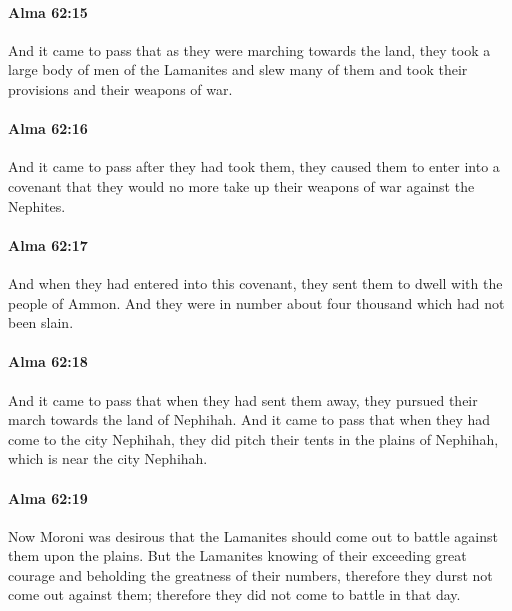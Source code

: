 		\paragraph{Alma 62:15} %
			\label{ALMA-62-15}

			And it came to pass that as they were marching towards the land,
			they took a large body of men of the Lamanites and slew many of them
			and took their provisions and their weapons of war.

		\paragraph{Alma 62:16} %
			\label{ALMA-62-16}

			And it came to pass after they had took them,
			they caused them to enter into a covenant
			that they would no more take up their weapons of war against the Nephites.

		\paragraph{Alma 62:17} %
			\label{ALMA-62-17}

			And when they had entered into this covenant,
			they sent them to dwell with the people of Ammon.
			And they were in number about four thousand which had not been slain.

		\paragraph{Alma 62:18} %
			\label{ALMA-62-18}

			And it came to pass that when they had sent them away,
			they pursued their march towards the land of Nephihah.
			And it came to pass that when they had come to the city Nephihah,
			they did pitch their tents in the plains of Nephihah,
			which is near the city Nephihah.

		\paragraph{Alma 62:19} %
			\label{ALMA-62-19}

			Now Moroni was desirous
			that the Lamanites should come out to battle against them upon the plains.
			But the Lamanites knowing of their exceeding great courage
			and beholding the greatness of their numbers,
			therefore they durst not come out against them;
			therefore they did not come to battle in that day.

